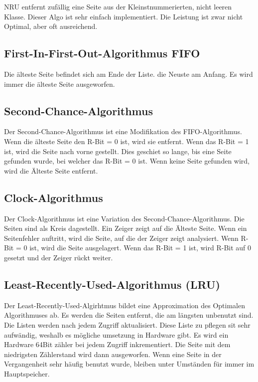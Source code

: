 NRU entfernt zufällig eine Seite aus der Kleinstnummerierten, nicht leeren Klasse. Dieser Algo ist sehr einfach implementiert. Die Leistung ist zwar nicht Optimal, aber oft ausreichend.

\subsection{First-In-First-Out-Algorithmus FIFO}

Die älteste Seite befindet sich am Ende der Liste. die Neuste am Anfang. Es wird immer die älteste Seite ausgeworfen.

\subsection{Second-Chance-Algorithmus}

Der Second-Chance-Algorithmus ist eine Modifikation des FIFO-Algorithmus. Wenn die älteste Seite den R-Bit = 0 ist, wird sie entfernt. Wenn das R-Bit = 1 ist, wird die Seite nach vorne gestellt. Dies geschiet so lange, bis eine Seite gefunden wurde, bei welcher das R-Bit = 0 ist. Wenn keine Seite gefunden wird, wird die Älteste Seite entfernt.

\subsection{Clock-Algorithmus}

Der Clock-Algorithmus ist eine Variation des Second-Chance-Algorithmus. Die Seiten sind als Kreis dagestellt. Ein Zeiger zeigt auf die Älteste Seite. Wenn ein Seitenfehler auftritt, wird die Seite, auf die der Zeiger zeigt analysiert. Wenn R-Bit = 0 ist, wird die Seite ausgelagert. Wenn das R-Bit = 1 ist, wird R-Bit auf 0 gesetzt und der Zeiger rückt weiter.

\subsection{Least-Recently-Used-Algorithmus (LRU)}

Der Least-Recently-Used-Algirhtmus bildet eine Approximation des Optimalen Algorithmuses ab. Es werden die Seiten entfernt, die am längsten unbenutzt sind. Die Listen werden nach jedem Zugriff aktualisiert. Diese Liste zu pflegen sit sehr aufwändig, weshalb es mögliche umsetzung in Hardware gibt. Es wird ein Hardware 64Bit zähler bei jedem Zugriff inkrementiert. Die Seite mit dem niedrigsten Zählerstand wird dann ausgeworfen. Wenn eine Seite in der Vergangenheit sehr häufig benutzt wurde, bleiben unter Umständen für immer im Hauptspeicher.

